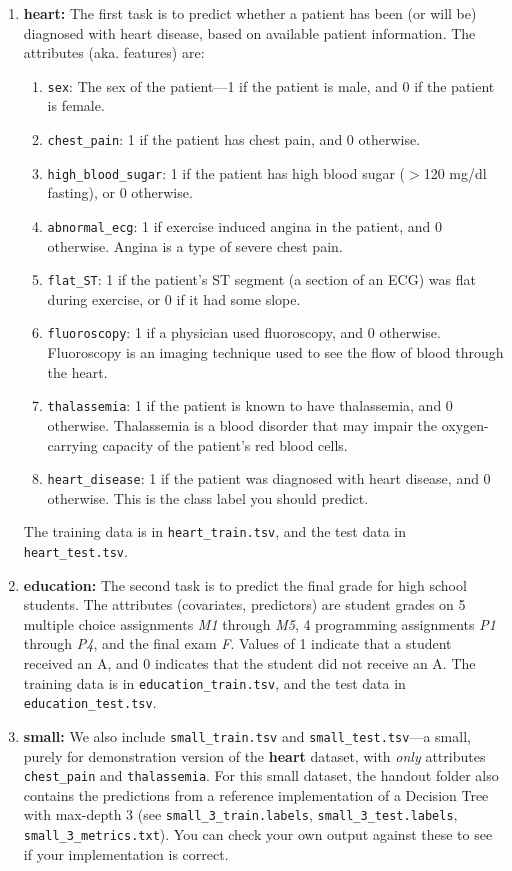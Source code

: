 \begin{enumerate}
\item \textbf{heart:}
    The first task is to predict whether a patient has been (or will be) diagnosed with heart disease, based on available patient information. The attributes (aka. features) are: 
    \begin{enumerate}
        \item \lstinline{sex}: The sex of the patient---1 if the patient is male, and 0 if the patient is female.
        \item \lstinline{chest_pain}: 1 if the patient has chest pain, and 0 otherwise.
        \item \lstinline{high_blood_sugar}: 1 if the patient has high blood sugar ($>$120 mg/dl fasting), or 0 otherwise.
        \item \lstinline{abnormal_ecg}: 1 if exercise induced angina in the patient, and 0 otherwise. Angina is a type of severe chest pain.
        \item \lstinline{flat_ST}: 1 if the patient's ST segment (a section of an ECG) was flat during exercise, or 0 if it had some slope.
        \item \lstinline{fluoroscopy}: 1 if a physician used fluoroscopy, and 0 otherwise. Fluoroscopy is an imaging technique used to see the flow of blood through the heart.
        \item \lstinline{thalassemia}: 1 if the patient is known to have thalassemia, and 0 otherwise. Thalassemia is a blood disorder that may impair the oxygen-carrying capacity of the patient's red blood cells.
        \item \lstinline{heart_disease}: 1 if the patient was diagnosed with heart disease, and 0 otherwise. This is the class label you should predict.
    \end{enumerate}
    The training data is in \lstinline{heart_train.tsv}, and the test data in \lstinline{heart_test.tsv}.
\item \textbf{education:}
    The second task is to predict the final grade for high school students. The attributes (covariates, predictors) are student grades on 5 multiple choice assignments \emph{M1} through \emph{M5}, 4 programming assignments \emph{P1} through \emph{P4}, and the final exam \emph{F}. Values of 1 indicate that a student received an A, and 0 indicates that the student did not receive an A. The training data is in \newline \lstinline{education_train.tsv}, and the test data in \lstinline{education_test.tsv}.
\item \textbf{small:}
    We also include \lstinline{small_train.tsv} and \lstinline{small_test.tsv}---a small, purely for demonstration version of the \textbf{heart} dataset, with \emph{only} attributes \lstinline{chest_pain} and \lstinline{thalassemia}.  
    For this small dataset, the handout folder also contains the predictions from a reference implementation of a Decision Tree with max-depth 3 (see \lstinline{small_3_train.labels}, \lstinline{small_3_test.labels}, \lstinline{small_3_metrics.txt}).
    You can check your own output against these to see if your implementation is correct.
\end{enumerate}

